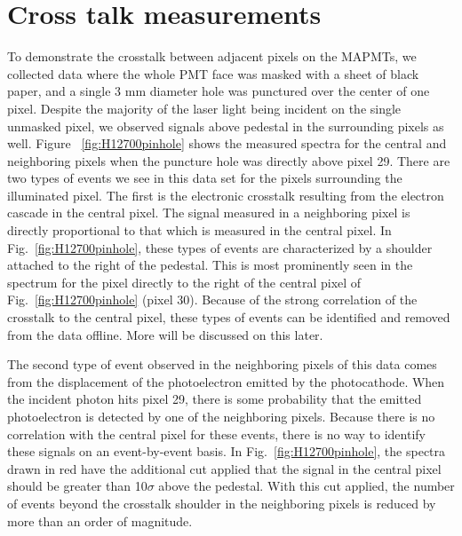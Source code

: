 \section{Cross talk measurements}

To demonstrate the crosstalk between adjacent pixels on the MAPMTs, we collected data where the whole PMT face was masked with a sheet of black paper, and a single 3 mm diameter hole was punctured over the center of one pixel. Despite the majority of the laser light being incident on the single unmasked pixel, we observed signals above pedestal in the surrounding pixels as well. Figure ~\ref{fig:H12700pinhole} shows the measured spectra for the central and neighboring pixels when the puncture hole was directly above pixel 29. There are two types of events we see in this data set for the pixels surrounding the illuminated pixel. The first is the electronic crosstalk resulting from the electron cascade in the central pixel. The signal measured in a neighboring pixel is directly proportional to that which is measured in the central pixel. In Fig.~\ref{fig:H12700pinhole}, these types of events are characterized by a shoulder attached to the right of the pedestal. This is most prominently seen in the spectrum for the pixel directly to the right of the central pixel of Fig.~\ref{fig:H12700pinhole} (pixel 30). Because of the strong correlation of the crosstalk to the central pixel, these types of events can be identified and removed from the data offline. More will be discussed on this later.

The second type of event observed in the neighboring pixels of this data comes from the displacement of the photoelectron emitted by the photocathode. When the incident photon hits pixel 29, there is some probability that the emitted photoelectron is detected by one of the neighboring pixels. Because there is no correlation with the central pixel for these events, there is no way to identify these signals on an event-by-event basis. In Fig.~\ref{fig:H12700pinhole}, the spectra drawn in red have the additional cut applied that the signal in the central pixel should be greater than 10$\sigma$ above the pedestal. With this cut applied, the number of events beyond the crosstalk shoulder in the neighboring pixels is reduced by more than an order of magnitude.


